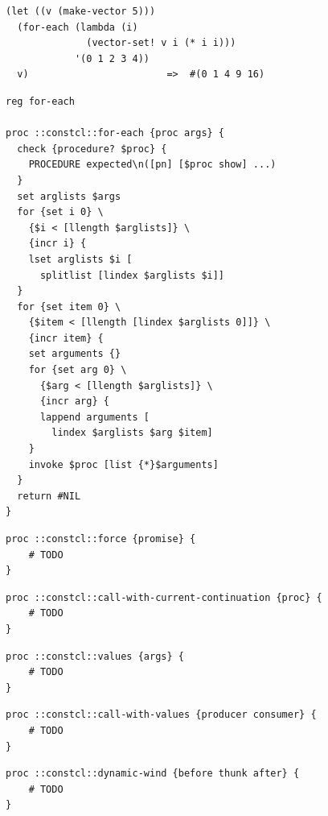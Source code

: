\documentclass[twoside,9pt]{report}
\begin{document}
\noindent\makebox[\linewidth]{\rule{\linewidth}{0.4pt}}
\begin{lstlisting}
(let ((v (make-vector 5)))
  (for-each (lambda (i)
              (vector-set! v i (* i i)))
            '(0 1 2 3 4))
  v)                        =>  #(0 1 4 9 16)
\end{lstlisting}
\noindent\makebox[\linewidth]{\rule{\linewidth}{0.4pt}}
\noindent\makebox[\linewidth]{\rule{\linewidth}{0.4pt}}
\begin{lstlisting}
reg for-each
 
proc ::constcl::for-each {proc args} {
  check {procedure? $proc} {
    PROCEDURE expected\n([pn] [$proc show] ...)
  }
  set arglists $args
  for {set i 0} \
    {$i < [llength $arglists]} \
    {incr i} {
    lset arglists $i [
      splitlist [lindex $arglists $i]]
  }
  for {set item 0} \
    {$item < [llength [lindex $arglists 0]]} \
    {incr item} {
    set arguments {}
    for {set arg 0} \
      {$arg < [llength $arglists]} \
      {incr arg} {
      lappend arguments [
        lindex $arglists $arg $item]
    }
    invoke $proc [list {*}$arguments]
  }
  return #NIL
}
\end{lstlisting}
\noindent\makebox[\linewidth]{\rule{\linewidth}{0.4pt}}
\noindent\makebox[\linewidth]{\rule{\linewidth}{0.4pt}}
\begin{lstlisting}
proc ::constcl::force {promise} {
    # TODO
}
\end{lstlisting}
\noindent\makebox[\linewidth]{\rule{\linewidth}{0.4pt}}
\noindent\makebox[\linewidth]{\rule{\linewidth}{0.4pt}}
\begin{lstlisting}
proc ::constcl::call-with-current-continuation {proc} {
    # TODO
}
\end{lstlisting}
\noindent\makebox[\linewidth]{\rule{\linewidth}{0.4pt}}
\noindent\makebox[\linewidth]{\rule{\linewidth}{0.4pt}}
\begin{lstlisting}
proc ::constcl::values {args} {
    # TODO
}
\end{lstlisting}
\noindent\makebox[\linewidth]{\rule{\linewidth}{0.4pt}}
\noindent\makebox[\linewidth]{\rule{\linewidth}{0.4pt}}
\begin{lstlisting}
proc ::constcl::call-with-values {producer consumer} {
    # TODO
}
\end{lstlisting}
\noindent\makebox[\linewidth]{\rule{\linewidth}{0.4pt}}
\noindent\makebox[\linewidth]{\rule{\linewidth}{0.4pt}}
\begin{lstlisting}
proc ::constcl::dynamic-wind {before thunk after} {
    # TODO
}
\end{lstlisting}
\noindent\makebox[\linewidth]{\rule{\linewidth}{0.4pt}}
\end{document}
